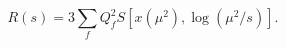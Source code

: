 \begin{equation}%
R(s) = 3 \sum_f Q_f^2 S \left[ x(\mu^2), \log (\mu^2 / s) \right].
\end{equation}

